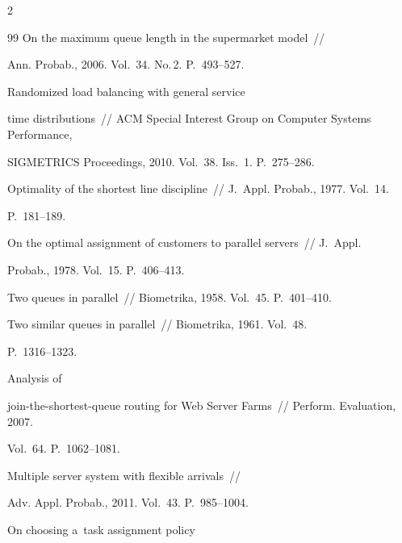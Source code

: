 \begin{multicols}{2}
{{\begin{thebibliography}{99}
     On the maximum queue length in the supermarket model~// 


Ann. Probab., 2006. Vol.~34. No.\,2. P.~493--527.




     Randomized load balancing with general service 


time distributions~// ACM Special Interest Group on Computer Systems Performance, 


SIGMETRICS Proceedings, 2010. Vol.~38. Iss.~1. P.~275--286.




     Optimality of the shortest line discipline~// J.~Appl. Probab., 1977. Vol.~14. 


P.~181--189.




     On the optimal assignment of customers to parallel servers~// J.~Appl. 


Probab., 1978. Vol.~15. P.~406--413.




     Two queues in parallel~// Biometrika, 1958. Vol.~45. P.~401--410.




     Two similar queues in parallel~// Biometrika, 1961. Vol.~48. 


P.~1316--1323.










     Analysis of 


    join-the-shortest-queue routing for Web Server Farms~// Perform. Evaluation, 2007. 


Vol.~64. P.~1062--1081.




     Multiple server system with flexible arrivals~// 


Adv. Appl. Probab., 2011. Vol.~43. P.~985--1004.




     On choosing a~task assignment policy 



\end{thebibliography}}}
\end{multicols}
